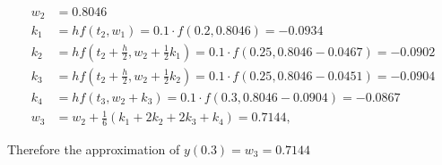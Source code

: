 \begin{solution}
$$
\begin{aligned}
w_{2} &=0.8046 \\
k_{1} &=h f\left(t_{2}, w_{1}\right)=0.1 \cdot f(0.2,0.8046)=-0.0934 \\
k_{2} &=h f\left(t_{2}+\frac{h}{2}, w_{2}+\frac{1}{2} k_{1}\right)
=0.1 \cdot f(0.25,0.8046-0.0467) =-0.0902 \\
k_{3} &=h f\left(t_{2}+\frac{h}{2}, w_{2}+\frac{1}{2} k_{2}\right) =0.1 \cdot f(0.25,0.8046-0.0451)=-0.0904\\
k_{4} &=h f\left(t_{3}, w_{2}+k_{3}\right)=0.1 \cdot f(0.3,0.8046-0.0904)=-0.0867  \\
w_{3} &=w_{2}+\frac{1}{6}\left(k_{1}+2 k_{2}+2 k_{3}+k_{4}\right)=0.7144,
\end{aligned}
$$

Therefore the approximation of $y(0.3)=w_3=0.7144$


\end{solution}
